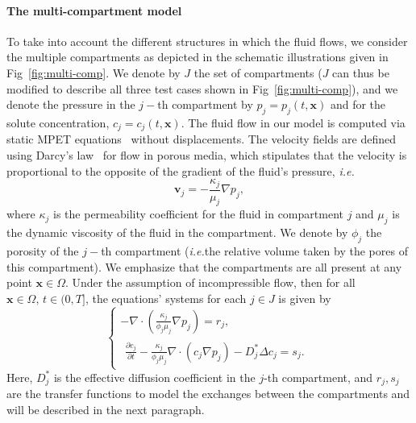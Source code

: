 \documentclass[a4paper,11pt]{article}
\newcommand{\ie}{\emph{i.e.}\;}
\newcommand{\1}{^{(1)}}
\newcommand{\2}{^{(2)}}
\renewcommand{\div}{\nabla\cdot}
\newcommand{\Lap}{\Delta}
\newcommand {\x}   {\mathbf{x}}
\newcommand {\vel}   {\mathbf{v}}
\begin{document}
\paragraph{The multi-compartment model}
To take into account the different structures in which the fluid flows, we consider the multiple compartments as depicted in the schematic illustrations given in Fig~\ref{fig:multi-comp}. We denote by $J$ the set of compartments ($J$ can thus be modified to describe all three test cases shown in Fig~\ref{fig:multi-comp}), and we denote the pressure in the $j-$th compartment by $p_j = p_j(t,\x)$ and for the solute concentration, $c_j = c_j(t,\x)$. 
The fluid flow in our model is computed via static MPET equations~\cite{Bai-MPET-1993, tully_ventikos_2011} without displacements. 
The velocity fields are defined using Darcy's law~\cite{darcy1856fontaines} for flow in porous media, which stipulates that the velocity is proportional to the opposite of the gradient of the fluid's pressure, \ie  
\begin{equation}
    \vel_j = -\frac{\kappa_j}{\mu_j} \nabla p_j,
\end{equation}
where $\kappa_j$ is the permeability coefficient for the fluid in compartment $j$ and $\mu_j$ is the dynamic viscosity of the fluid in the compartment. 
We denote by $\phi_j$ the porosity of the $j-$th compartment (\ie the relative volume taken by the pores of this compartment).
We emphasize that the compartments are all present at any point $\x\in \Omega$. Under the assumption of incompressible flow, then for all $\x\in \Omega,\, t\in (0,T]$, the equations' systems for each $j\in J$ is given by
\begin{equation}
    \begin{cases}
         -  \nabla\cdot( \frac{\kappa_j}{\phi_j \mu_j} \nabla p_j) = r_j,\\ %
          \begin{multlined} \frac{\partial c_j}{\partial t} - \frac{ \kappa_j}{\phi_j \mu_j}\div\left( c_j  \nabla p_j\right)  - D_j^* \Lap c_j 
         = s_j.%
         \end{multlined}
    \end{cases}
    \label{eq:main-system}
\end{equation}
Here, $D_j^*$ is the effective diffusion coefficient in the $j$-th compartment, and $r_{j}, s_{j}$ are the transfer functions to model the exchanges between the compartments and will be described in the next paragraph. 
\end{document}
